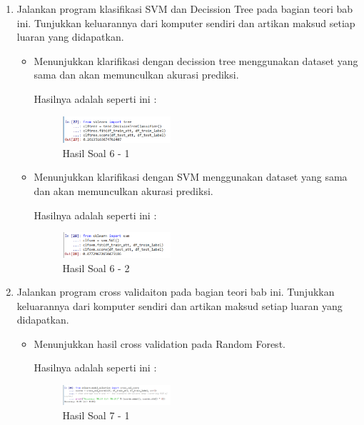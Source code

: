 \begin{enumerate}
\begin{itemize}
\end{itemize}


\item Jalankan program klasifikasi SVM dan Decission Tree pada bagian teori bab ini. Tunjukkan keluarannya dari komputer sendiri dan artikan maksud setiap luaran yang didapatkan.
	\hfill\break
\begin{itemize}
	\item Menunjukkan klarifikasi dengan decission tree menggunakan dataset yang sama dan akan memunculkan akurasi prediksi.
	
	Hasilnya adalah seperti ini :

	\begin{figure}[H]
	\centering
		\includegraphics[width=4cm]{figures/1174026/3/materi/soal61.PNG}
		\caption{Hasil Soal 6 - 1}
	\end{figure}

	\item Menunjukkan klarifikasi dengan SVM menggunakan dataset yang sama dan akan memunculkan akurasi prediksi.
	
	Hasilnya adalah seperti ini :

	\begin{figure}[H]
	\centering
		\includegraphics[width=4cm]{figures/1174026/3/materi/soal62.PNG}
		\caption{Hasil Soal 6 - 2}
	\end{figure}
\end{itemize}


\item Jalankan program cross validaiton pada bagian teori bab ini. Tunjukkan keluarannya dari komputer sendiri dan artikan maksud setiap luaran yang didapatkan.
	\hfill\break
\begin{itemize}
	\item Menunjukkan hasil cross validation pada Random Forest.
	
	Hasilnya adalah seperti ini :

	\begin{figure}[H]
	\centering
		\includegraphics[width=4cm]{figures/1174026/3/materi/soal71.PNG}
		\caption{Hasil Soal 7 - 1}
	\end{figure}


\end{itemize}
\end{enumerate}
